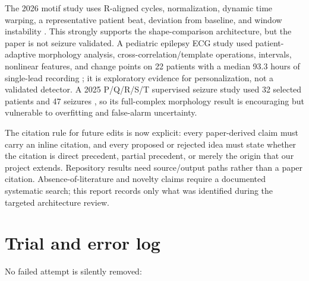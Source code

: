 \documentclass[11pt,a4paper]{article}
\begin{document}
The 2026 motif study uses R-aligned cycles, normalization, dynamic time warping, a representative patient beat, deviation from baseline, and window instability \cite{motif2026}. This strongly supports the shape-comparison architecture, but the paper is not seizure validated. A pediatric epilepsy ECG study used patient-adaptive morphology analysis, cross-correlation/template operations, intervals, nonlinear features, and change points on 22 patients with a median 93.3 hours of single-lead recording \cite{pediatric2021}; it is exploratory evidence for personalization, not a validated detector. A 2025 P/Q/R/S/T supervised seizure study used 32 selected patients and 47 seizures \cite{supervisedpqrst}, so its full-complex morphology result is encouraging but vulnerable to overfitting and false-alarm uncertainty.

The citation rule for future edits is now explicit: every paper-derived claim must
carry an inline citation, and every proposed or rejected idea must state whether
the citation is direct precedent, partial precedent, or merely the origin that
our project extends. Repository results need source/output paths rather than a
paper citation. Absence-of-literature and novelty claims require a documented
systematic search; this report records only what was identified during the
targeted architecture review.

\section{Trial and error log}
\label{sec:errors}

No failed attempt is silently removed:
\end{document}
